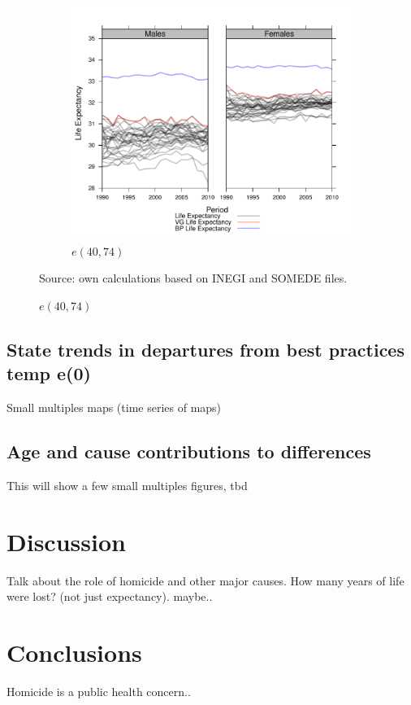 \documentclass{article}
\begin{document}
\begin{figure}
\begin{subfigure}{\textwidth}
\end{subfigure}
\\
\begin{subfigure}{\textwidth}
\centering
\caption{$e(40,74)$}
\label{fig:e40_74}
\includegraphics[scale=.5]{Figures/et40_74.pdf}
\end{subfigure}
Source: own calculations based on INEGI and SOMEDE files. 
\end{figure}


\subsection*{State trends in departures from best practices temp e(0)}
Small multiples maps (time series of maps)

\subsection*{Age and cause contributions to differences}

This will show a few small multiples figures, tbd 

\section*{Discussion}
Talk about the role of homicide and other major causes. How many years of life
were lost? (not just expectancy). maybe..

\section*{Conclusions}
Homicide is a public health concern..


%
 
\end{document}
